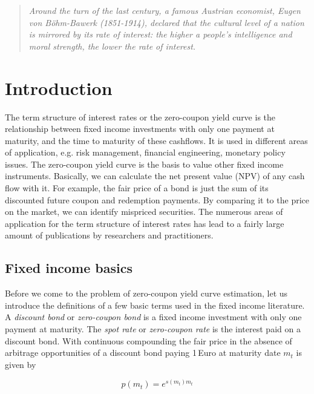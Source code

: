 
\begin{quote}
\emph{
  Around the turn of the last century, a famous Austrian economist, Eugen von B\"{o}hm-Bawerk (1851-1914), declared that the cultural level of a nation is  mirrored by its rate of interest: the higher a people's intelligence and moral strength, the lower the rate of interest.}
\\
\end{quote}


\section{Introduction}


The term structure of interest rates or the zero-coupon yield curve is the relationship between fixed income investments with only one payment at maturity, and the time to maturity of these cashflows. It is used in different areas of application, e.g. risk management, financial engineering, monetary policy issues. The zero-coupon yield curve is the basis to value other fixed income instruments. Basically, we can calculate the net present value (NPV) of any cash flow with it. For example, the fair price of a bond is just the sum of its discounted future coupon and redemption payments. By comparing it to the price on the market, we can identify mispriced securities. The numerous areas of application for the term structure of interest rates has lead to a fairly large amount of publications by researchers and practitioners.

\subsection{Fixed income basics}

Before we come to the problem of zero-coupon yield curve estimation, let us introduce the definitions of a few basic terms used in the fixed income literature. A \emph{discount bond} or \emph{zero-coupon bond} is a fixed income investment with only one payment at maturity. The \emph{spot rate} or \emph{zero-coupon rate} is the interest paid on a discount bond. With continuous compounding the fair price in the absence of arbitrage opportunities of a discount bond paying 1\,Euro at maturity date  $m_t$ is given by

\begin{equation}
  \label{eq:pricediscountbond}
  p(m_t)=e^{s(m_t)m_t}
\end{equation}

